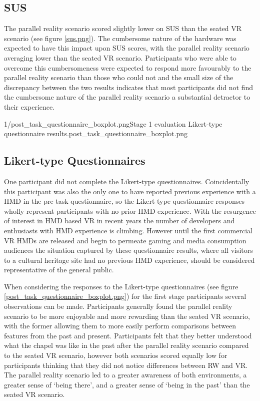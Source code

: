 
\subsection{SUS}
The parallel reality scenario scored slightly lower on SUS than the seated VR scenario (see figure \ref{sus.png}). The cumbersome nature of the hardware was expected to have this impact upon SUS scores, with the parallel reality scenario averaging lower than the seated VR scenario. Participants who were able to overcome this cumbersomeness were expected to respond more favourably to the parallel reality scenario than those who could not and the small size of the discrepancy between the two results indicates that most participants did not find the cumbersome nature of the parallel reality scenario a substantial detractor to their experience.

       {1/post_task_questionnaire_boxplot.png}{Stage 1 evaluation Likert-type questionnaire results.}{post_task_questionnaire_boxplot.png}


\subsection{Likert-type Questionnaires}

One participant did not complete the Likert-type questionnaires. Coincidentally this participant was also the only one to have reported previous experience with a HMD in the pre-task questionnaire, so the Likert-type questionnaire responses wholly represent participants with no prior HMD experience. With the resurgence of interest in HMD based VR in recent years the number of developers and enthusiasts with HMD experience is climbing. However until the first commercial VR HMDs are released and begin to permeate gaming and media consumption audiences the situation captured by these questionnaire results, where all visitors to a cultural heritage site had no previous HMD experience, should be considered representative of the general public.

When considering the responses to the Likert-type questionnaires (see figure \ref{post_task_questionnaire_boxplot.png}) for the first stage participants several observations can be made. Participants generally found the parallel reality scenario to be more enjoyable and more rewarding than the seated VR scenario, with the former allowing them to more easily perform comparisons between features from the past and present. Participants felt that they better understood what the chapel was like in the past after the parallel reality scenario compared to the seated VR scenario, however both scenarios scored equally low for participants thinking that they did not notice differences between RW and VR. The parallel reality scenario led to a greater awareness of both environments, a greater sense of `being there', and a greater sense of `being in the past' than the seated VR scenario.

